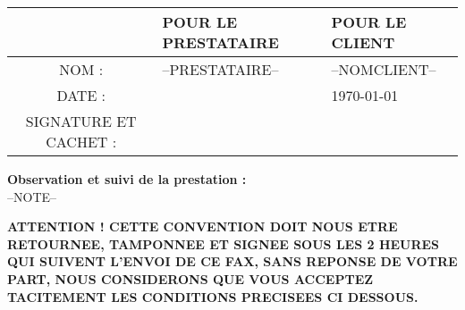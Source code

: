 \documentclass[a4paper, oneside, 8pt, french]{article}
\begin{document}
\begin{center}
\begin{tabular}{|c|p{6cm}|p{6cm}|}
\hline 
 & POUR LE PRESTATAIRE & POUR LE CLIENT \\ 
\hline
 NOM : & --PRESTATAIRE-- & --NOMCLIENT-- \\ 
\hline
DATE : &  & \today \\ 
\hline
SIGNATURE ET CACHET : &  &  
\\ [1cm]
\hline 
\end{tabular} 
\end{center}

\begin{fminipage}
\textbf{Observation et suivi de la prestation :} \\ 
--NOTE--
\end{fminipage}

\textbf{ATTENTION ! CETTE CONVENTION DOIT NOUS ETRE RETOURNEE, TAMPONNEE ET SIGNEE SOUS LES 2 HEURES QUI SUIVENT L'ENVOI DE CE FAX, SANS REPONSE DE VOTRE PART, NOUS CONSIDERONS QUE VOUS ACCEPTEZ TACITEMENT LES CONDITIONS PRECISEES CI DESSOUS.}
\end{document}
